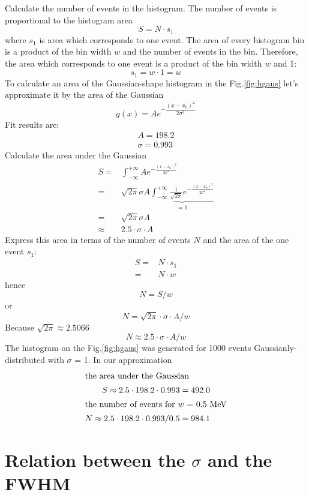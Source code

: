 \documentclass[english]{article}
\begin{document}
Calculate the number of events in the histogram. 
The number of events is proportional to the histogram area
$$
S = N \cdot s_1
$$
where $s_1$ is area which corresponds to one event. 
The area of every histogram bin is a product of the bin width $w$ and the number of events in the bin.
Therefore, the area which corresponds to one event is a product of the bin width $w$ and 1: 
$$
s_1 = w \cdot 1 = w
$$
To calculate an area of the Gaussian-shape histogram in the Fig.\ref{fig:hgaus} let's approximate it by the area of the Gaussian
$$
g(x) = Ae^{-\dfrac{(x-x_0)^2}{2\sigma^2}}
$$
Fit results are:
%
\begin{align*}
A = 198.2 \\
\sigma = 0.993
\end{align*}
%
Calculate the area under the Gaussian
%
\begin{align*}
S = & \int_{-\infty}^{+\infty} A e^{-\frac{(x-x_0)^2}{2\sigma^2}} \\
= & \sqrt{2\pi} \sigma A \underbrace{\int_{-\infty}^{+\infty} \frac{1}{\sqrt{2\pi}} e^{-\frac{(x-x_0)^2}{2\sigma^2}}}_{= 1} \\
= & \sqrt{2\pi} \sigma A \\
\approx & 2.5 \cdot \sigma \cdot A
\end{align*}
%
Express this area in terms of the number of events $N$ and the area of the one event $s_1$:
\begin{align*}
S = & N \cdot s_1 \\
= & N \cdot w
\end{align*}
hence
$$
N = S / w 
$$
or
$$
N = \sqrt{2\pi} \cdot \sigma \cdot A / w
$$
Because $\sqrt{2\pi} \approx 2.5066$
$$
N \approx 2.5 \cdot \sigma \cdot A / w
$$
The histogram on the Fig.\ref{fig:hgaus} was generated for 1000 events Gaussianly-distributed with $\sigma$ = 1. 
In our approximation
\begin{align*}
\intertext{the area under the Gaussian}
S \approx 2.5 \cdot 198.2 \cdot 0.993 = 492.0 \\
\intertext{the number of events for $w$ = 0.5~MeV}
N \approx 2.5 \cdot 198.2 \cdot 0.993 / 0.5  = 984.1 \\
\end{align*}

\section{Relation between the $\sigma$ and the FWHM}
\end{document}
